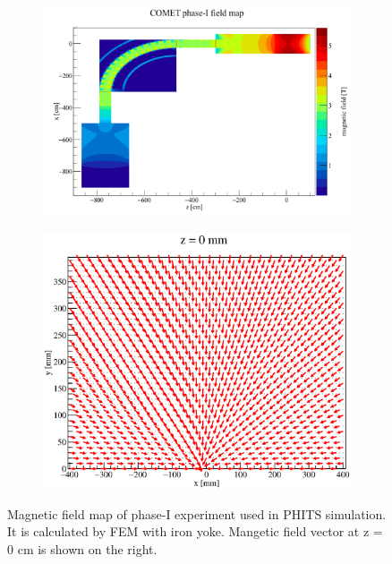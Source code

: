  \begin{figure}[H]
  \begin{subfigure}{0.3\textwidth}
   \centering
   \includegraphics[scale=0.32]{chapter3/fig/fieldmap.pdf}
  \end{subfigure}
  \hspace{0.2\textwidth}
  \begin{subfigure}{0.3\textwidth}
   \centering
   \includegraphics[scale=0.35]{chapter3/fig/fieldxy}
  \end{subfigure}
  \caption{Magnetic field map of phase-I experiment used in PHITS simulation. It is calculated by FEM with iron yoke. Mangetic field vector at z = 0 cm is shown on the right.}
  \label{field}
 \end{figure}


